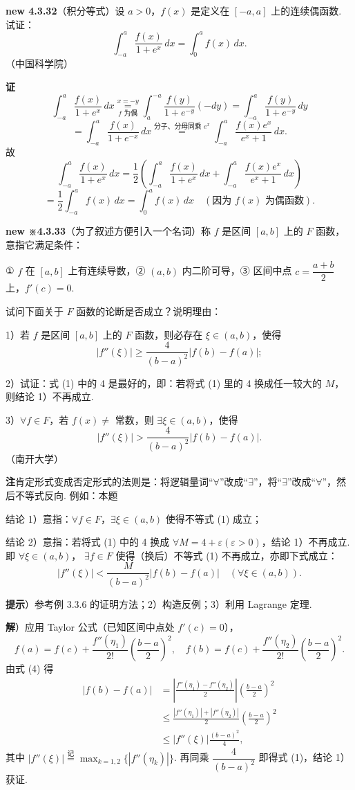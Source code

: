 \documentclass[UTF8, 12pt, fontset=fandol, oneside]{ctexart}
\begin{document}
\noindent\textbf{new 4.3.32}\quad（积分等式）设 $a>0$，$f(x)$ 是定义在 $[-a,a]$ 上的连续偶函数. 试证：
\[
\int_{-a}^a\frac{f(x)}{1+e^x}\,dx=\int_0^a f(x)\,dx.
\]
（中国科学院）

\noindent\textbf{证}\quad
\[
\int_{-a}^a\frac{f(x)}{1+e^x}\,dx
\stackrel{x=-y}{\underset{f\text{ 为偶}}=}
\int_a^{-a}\frac{f(y)}{1+e^{-y}}(-dy)
=\int_{-a}^a\frac{f(y)}{1+e^{-y}}\,dy
\]
\[
=\int_{-a}^a\frac{f(x)}{1+e^{-x}}\,dx
\stackrel{\text{分子、分母同乘 }e^x}{=}
\int_{-a}^a\frac{f(x)e^x}{e^x+1}\,dx.
\]
故
\[
\int_{-a}^a\frac{f(x)}{1+e^x}\,dx
=\frac12\left(
\int_{-a}^a\frac{f(x)}{1+e^x}\,dx
+\int_{-a}^a\frac{f(x)e^x}{e^x+1}\,dx\right)
\]
\[
=\frac12\int_{-a}^a f(x)\,dx
=\int_0^a f(x)\,dx
\quad(\text{因为 }f(x)\text{ 为偶函数}).
\]

\noindent\textbf{new ※4.3.33}\quad（为了叙述方便引入一个名词）称 $f$ 是区间 $[a,b]$ 上的 $F$ 函数，意指它满足条件：

① $f$ 在 $[a,b]$ 上有连续导数，② $(a,b)$ 内二阶可导，③ 区间中点
$c=\dfrac{a+b}2$ 上，$f'(c)=0$.

试问下面关于 $F$ 函数的论断是否成立？说明理由：

1）若 $f$ 是区间 $[a,b]$ 上的 $F$ 函数，则必存在 $\xi\in(a,b)$，使得
\[
|f''(\xi)|\ge\frac4{(b-a)^2}|f(b)-f(a)|; \tag{1}
\]

2）试证：式 (1) 中的 4 是最好的，即：若将式 (1) 里的 4 换成任一较大的 $M$，则结论 1）不再成立.

3）$\forall f\in F$，若 $f(x)\ne$ 常数，则 $\exists\xi\in(a,b)$，使得
\[
|f''(\xi)|>\frac4{(b-a)^2}|f(b)-f(a)|. \tag{2}
\]
（南开大学）

\noindent\textbf{注}\quad 肯定形式变成否定形式的法则是：将逻辑量词“$\forall$”改成“$\exists$”，将“$\exists$”改成“$\forall$”，然后不等式反向. 例如：本题

结论 1）意指：$\forall f\in F$，$\exists\xi\in(a,b)$ 使得不等式 (1) 成立；

\noindent 结论 2）意指：若将式 (1) 中的 4 换成 $\forall M=4+\varepsilon(\varepsilon>0)$，结论 1）不再成立. 即 $\forall \xi\in(a,b)$，
$\exists f\in F$ 使得（换后）不等式 (1) 不再成立，亦即下式成立：
\[
|f''(\xi)|<\frac{M}{(b-a)^2}|f(b)-f(a)|\quad(\forall \xi\in(a,b)). \tag{3}
\]

\noindent\textbf{提示}）参考例 3.3.6 的证明方法；2）构造反例；3）利用 Lagrange 定理.

\noindent\textbf{解}）应用 Taylor 公式（已知区间中点处 $f'(c)=0$），
\[
f(a)=f(c)+\frac{f''(\eta_1)}{2!}\left(\frac{b-a}{2}\right)^2,\quad
f(b)=f(c)+\frac{f''(\eta_2)}{2!}\left(\frac{b-a}{2}\right)^2. \tag{4}
\]
由式 (4) 得
\[
\begin{aligned}
|f(b)-f(a)|
&=\left|\frac{f''(\eta_1)-f''(\eta_2)}2\right|
\left(\frac{b-a}{2}\right)^2\\
&\le \frac{|f''(\eta_1)|+|f''(\eta_2)|}{2}
\left(\frac{b-a}{2}\right)^2\\
&\le |f''(\xi)|\frac{(b-a)^2}{4},
\end{aligned}
\]
其中 $|f''(\xi)|\stackrel{\text{记}}{=}\max_{k=1,2}\{|f''(\eta_k)|\}$.
再同乘 $\dfrac4{(b-a)^2}$ 即得式 (1)，结论 1）获证.
\end{document}
